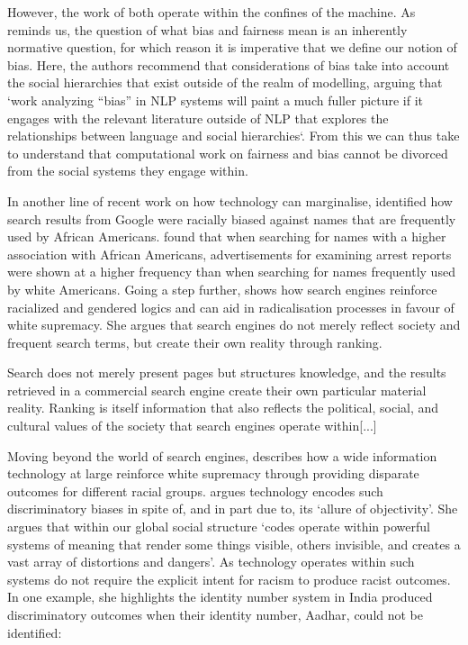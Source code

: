 However, the work of \cite{Kearns:2018,Foulds:2019} both operate within the confines of the machine. As \cite{Blodgett:2020} reminds us, the question of what bias and fairness mean is an inherently normative question, for which reason it is imperative that we define our notion of bias. Here, the authors recommend that considerations of bias take into account the social hierarchies that exist outside of the realm of modelling, arguing that `work analyzing ``bias'' in NLP systems will paint a much fuller picture if it engages with the relevant literature outside of NLP that explores the relationships between language and social hierarchies`. From this we can thus take to understand that computational work on fairness and bias cannot be divorced from the social systems they engage within.

In another line of recent work on how technology can marginalise, \cite{Sweeney:2013} identified how search results from Google were racially biased against names that are frequently used by African Americans. \cite{Sweeney:2013} found that when searching for names with a higher association with African Americans, advertisements for examining arrest reports were shown at a higher frequency than when searching for names frequently used by white Americans. Going a step further, \cite{Noble:2018} shows how search engines reinforce racialized and gendered logics and can aid in radicalisation processes in favour of white supremacy. She argues that search engines do not merely reflect society and frequent search terms, but create their own reality through ranking.

\begin{aquote}{\citet[p.148]{Noble:2018}}
  Search does not merely present pages but structures knowledge, and the results retrieved in a commercial search engine create their own particular material reality. Ranking is itself information that also reflects the political, social, and cultural values of the society that search engines operate within[...]
\end{aquote}

Moving beyond the world of search engines, \cite{Benjamin:2019} describes how a wide information technology at large reinforce white supremacy through providing disparate outcomes for different racial groups. \cite{Benjamin:2019} argues technology encodes such discriminatory biases in spite of, and in part due to, its `allure of objectivity'. She argues that within our global social structure `codes operate within powerful systems of meaning that render some things visible, others invisible, and creates a vast array of distortions and dangers'. As technology operates within such systems do not require the explicit intent for racism to produce racist outcomes. In one example, she highlights the identity number system in India produced discriminatory outcomes when their identity number, Aadhar, could not be identified:

